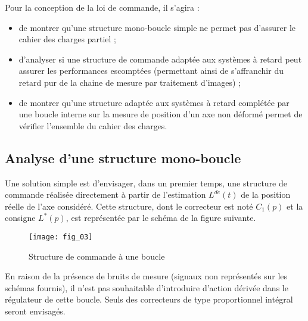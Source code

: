 \ifcolle
\else
Pour la conception de la loi de commande, il s’agira :
\begin{itemize}
\item de montrer qu’une structure mono-boucle simple ne permet pas d’assurer le cahier des charges partiel ;
\item d’analyser si une structure de commande adaptée aux systèmes à retard peut assurer les performances
escomptées (permettant ainsi de s’affranchir du retard pur de la chaine de mesure par traitement d’images) ;
\item de montrer qu’une structure adaptée aux systèmes à retard complétée par une boucle interne sur la mesure
de position d’un axe non déformé permet de vérifier l’ensemble du cahier des charges.
\end{itemize}

\fi
\fi

\subsection*{Analyse d’une structure mono-boucle}

\ifprof
\else
Une solution simple est d’envisager, dans un premier temps, une structure de commande réalisée directement à
partir de l’estimation $L^{de}(t)$ de la position réelle de l’axe considéré. Cette structure, dont le correcteur est noté
$C_1(p)$ et la consigne $L^{*}(p)$, est représentée par le schéma de la figure suivante.



\begin{figure}[!h]
\texttt{[image: fig\_03]}
\caption{Structure de commande à une boucle}
\end{figure}

En raison de la présence de bruits de mesure (signaux non représentés sur les schémas fournis), il n’est pas
souhaitable d’introduire d’action dérivée dans le régulateur de cette boucle. Seuls des correcteurs de type
proportionnel intégral seront envisagés.
\fi


